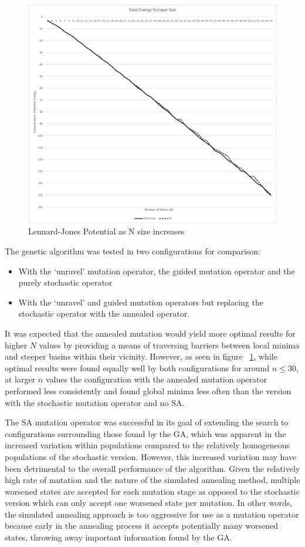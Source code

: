\documentclass{article}
\begin{document}
\begin{figure}
	\includegraphics[width=\textwidth]{nvse.pdf}
	\caption{Lennard-Jones Potential as N size increases}
	\label{fig:nvse}
\end{figure}

The genetic algorithm was tested in two configurations for comparison:
\begin{itemize}
	\item With the `unravel' mutation operator, the guided mutation operator and
	the purely stochastic operator
	\item With the `unravel' and guided mutation operators but replacing the
	stochastic operator with the annealed operator.
\end{itemize}
It was expected that the annealed mutation would yield more optimal results
for higher $N$ values by providing a means of traversing barriers between local
minima and steeper basins within their vicinity. However, as seen in figure~
\ref{fig:nvse}, while optimal results were found equally well by both
configurations for around $n \leq 30$, at larger $n$ values the configuration
with the annealed mutation operator performed less consistently and found
global minima less often than the version with the stochastic mutation operator
and no SA.

The SA mutation operator was successful in its goal of extending the search to
configurations
surrounding those found by the GA, which was apparent in the increased variation
within populations compared to the relatively homogeneous populations of the
stochastic version. However, this increased variation may
have been detrimental to the overall performance of the algorithm. Given the
relatively high rate of mutation and the nature of the simulated annealing
method, multiple worsened states are accepted for each mutation stage as opposed
to the stochastic version which can only accept one worsened state per
mutation. In other words, the simulated annealing approach is too aggressive
for use as a mutation operator because early in the annealing process it accepts
potentially many worsened states, throwing away important information found by
the GA.
\end{document}

